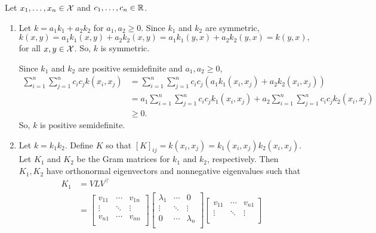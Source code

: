 
Let \(x_1, \dots, x_n \in \mathcal{X}\) and \(c_1, \dots, c_n \in \mathbb{R}\).
\begin{enumerate}
    \item \label{itm:kernel-linear-combo}
    Let \(k = a_1k_1 + a_2k_2\) for \(a_1, a_2 \geq 0\).
    Since \(k_1\) and \(k_2\) are symmetric,
    \[
        k(x,y)
        = a_1k_1(x,y) + a_2k_2(x,y)
        = a_1k_1(y,x) + a_2k_2(y,x)
        = k(y,x),
    \]
    for all \(x,y \in \mathcal{X}\).
    So, \(k\) is symmetric.

    Since \(k_1\) and \(k_2\) are positive semidefinite and \(a_1, a_2 \geq 0\),
    \begin{align*}
        \sum_{i=1}^{n} \sum_{j=1}^{n} c_i c_j k(x_i,x_j)
        &= \sum_{i=1}^{n} \sum_{j=1}^{n} c_i c_j (a_1 k_1(x_i,x_j) + a_2 k_2(x_i,x_j))\\
        &= a_1 \sum_{i=1}^{n} \sum_{j=1}^{n} c_i c_j k_1(x_i,x_j)
        + a_2 \sum_{i=1}^{n} \sum_{j=1}^{n} c_i c_j k_2(x_i,x_j)\\
        &\geq 0.
    \end{align*}
    So, \(k\) is positive semidefinite.
    \item \label{itm:kernel-product}
    Let \(k = k_1 k_2\).
    Define \(K\) so that \([K]_{ij} = k(x_i,x_j) = k_1(x_i, x_j) k_2(x_i, x_j)\).
    Let \(K_1\) and \(K_2\) be the Gram matrices for \(k_1\) and \(k_2\), respectively.
    Then \(K_1, K_2\) have orthonormal eigenvectors and nonnegative eigenvalues such that
    \def\dsum{\displaystyle\sum}
    \begin{align*}
        K_1 &= V LV^\top \\
        &= \begin{bmatrix}
            v_{11} & \cdots & v_{1n}\\
            \vdots & \ddots & \vdots\\
            v_{n1} & \cdots & v_{nn}\\
        \end{bmatrix}
        \begin{bmatrix}
            \lambda_{1} & \cdots & 0\\
            \vdots & \ddots & \vdots\\
            0 & \cdots & \lambda_{n}\\
        \end{bmatrix}
        \begin{bmatrix}
            v_{11} & \cdots & v_{n1}\\
            \vdots & \ddots & \vdots\\

\end{bmatrix}
\end{align*}
\end{enumerate}
